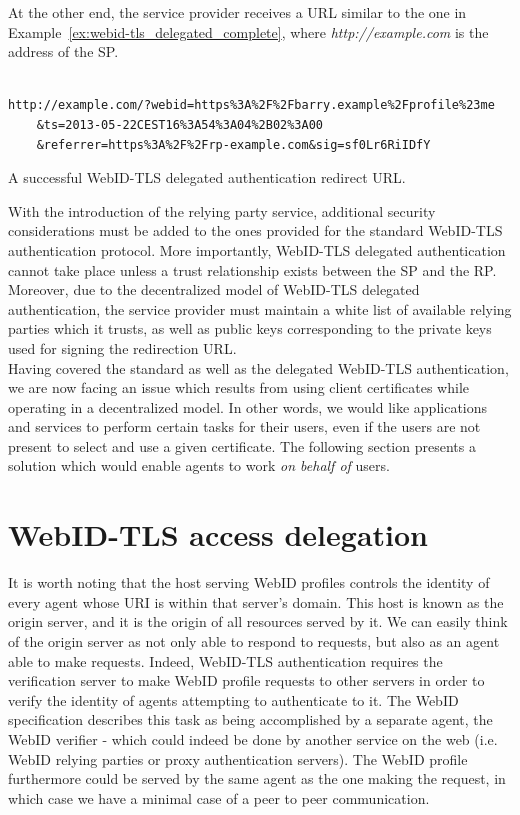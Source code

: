 At the other end, the service provider receives a URL similar to the one in Example~\ref{ex:webid-tls_delegated_complete}, where \textit{http://example.com} is the address of the SP.\\

\begin{example}
\begin{verbatim}

http://example.com/?webid=https%3A%2F%2Fbarry.example%2Fprofile%23me
	&ts=2013-05-22CEST16%3A54%3A04%2B02%3A00
	&referrer=https%3A%2F%2Frp-example.com&sig=sf0Lr6RiIDfY

\end{verbatim}
\caption{A successful WebID-TLS delegated authentication redirect URL.}
\label{ex:webid-tls_delegated_complete}
\end{example}

With the introduction of the relying party service, additional security considerations must be added to the ones provided for the standard WebID-TLS authentication protocol. More importantly, WebID-TLS delegated authentication cannot take place unless a trust relationship exists between the SP and the RP. Moreover, due to the decentralized model of WebID-TLS delegated authentication, the service provider must maintain a white list of available relying parties which it trusts, as well as public keys corresponding to the private keys used for signing the redirection URL.\\

Having covered the standard as well as the delegated WebID-TLS authentication, we are now facing an issue which results from using client certificates while operating in a decentralized model. In other words, we would like applications and services to perform certain tasks for their users, even if the users are not present to select and use a given certificate. The following section presents a solution which would enable agents to work \textit{on behalf of} users.

\section{WebID-TLS access delegation}
\label{sec:webid-delegated-access}
It is worth noting that the host serving WebID profiles controls the identity of every agent whose URI is within that server's domain. This host is known as the origin server, and it is the origin of all resources served by it. We can easily think of the origin server as not only able to respond to requests, but also as an agent able to make requests. Indeed, WebID-TLS authentication requires the verification server to make WebID profile requests to other servers in order to verify the identity of agents attempting to authenticate to it. The WebID specification describes this task as being accomplished by a separate agent, the WebID verifier - which could indeed be done by another service on the web (i.e. WebID relying parties or proxy authentication servers). The WebID profile furthermore could be served by the same agent as the one making the request, in which case we have a minimal case of a peer to peer communication.\\

